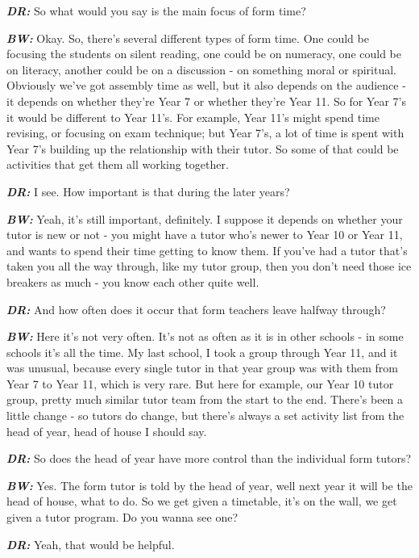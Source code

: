 \textit{\textbf{DR:}} So what would you say is the main focus of form time?

\textit{\textbf{BW:}} Okay. So, there's several different types of form time. One could be focusing the students on silent reading, one could be on numeracy, one could be on literacy, another could be on a discussion - on something moral or spiritual. Obviously we've got assembly time as well, but it also depends on the audience - it depends on whether they're Year 7 or whether they're Year 11. So for Year 7's it would be different to Year 11's. For example, Year 11's might spend time revising, or focusing on exam technique; but Year 7's, a lot of time is spent with Year 7's building up the relationship with their tutor. So some of that could be activities that get them all working together.

\textit{\textbf{DR:}} I see. How important is that during the later years?

\textit{\textbf{BW:}} Yeah, it's still important, definitely. I suppose it depends on whether your tutor is new or not - you might have a tutor who's newer to Year 10 or Year 11, and wants to spend their time getting to know them. If you've had a tutor that's taken you all the way through, like my tutor group, then you don't need those ice breakers as much - you know each other quite well.

\textit{\textbf{DR:}} And how often does it occur that form teachers leave halfway through?

\textit{\textbf{BW:}} Here it's not very often. It's not as often as it is in other schools - in some schools it's all the time. My last school, I took a group through Year 11, and it was unusual, because every single tutor in that year group was with them from Year 7 to Year 11, which is very rare. But here for example, our Year 10 tutor group, pretty much similar tutor team from the start to the end. There's been a little change - so tutors do change, but there's always a set activity list from the head of year, head of house I should say.

\textit{\textbf{DR:}} So does the head of year have more control than the individual form tutors?

\textit{\textbf{BW:}} Yes. The form tutor is told by the head of year, well next year it will be the head of house, what to do. So we get given a timetable, it's on the wall, we get given a tutor program. Do you wanna see one?

\textit{\textbf{DR:}} Yeah, that would be helpful.

